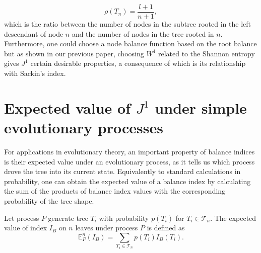\begin{equation}
    \rho(T_n) = \frac{l+1}{n+1},
\end{equation}
which is the ratio between the number of nodes in the subtree rooted in the left descendant of node $n$ and the number of nodes in the tree rooted in $n$. Furthermore, one could choose a node balance function based on the root balance but as shown in our previous paper, choosing $W^1$ related to the Shannon entropy gives $J^1$ certain desirable properties, a consequence of which is its relationship with Sackin's index. \par
\fi

        
\section{Expected value of $J^1$ under simple evolutionary processes}\label{expsection}
For applications in evolutionary theory, an important property of balance indices is their expected value under an evolutionary process, as it tells us which process drove the tree into its current state. Equivalently to standard calculations in probability, one can obtain the expected value of a balance index by calculating the sum of the products of balance index values with the corresponding probability of the tree shape. 
\begin{definition}
Let process $P$ generate tree $T_i$ with probability $p(T_i)$ for $T_i\in\mathcal{T}_n$. The expected value of index $I_B$ on $n$ leaves under process $P$ is defined as
    \begin{equation}\label{expvaldef}
        \mathbb{E}_P^n(I_B) = \sum_{T_i\in\mathcal{T}_n} p(T_i)I_B(T_i).
    \end{equation}
\end{definition}

